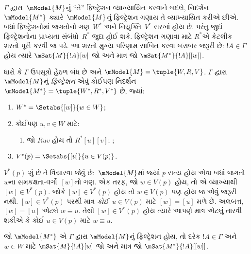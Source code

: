 \documentclass[../../../include/open-logic-section]{subfiles}
\begin{document}


$\Gamma$ દ્વારા~$\mModel{M}$નું ``તે'' ફિલ્ટ્રેશન વ્યાખ્યાયિત
કરવાને બદલે, નિદર્શન~$\mModel{M^*}$ ક્યારે~$\mModel{M}$નું
ફિલ્ટ્રેશન ગણાય તે વ્યાખ્યાયિત કરીએ છીએ. બધાં ફિલ્ટ્રેશનોમાં
જગતોનો ગણ~$W^*$ અને નિયુક્તિ~$V^*$ સરખાં હોય છે. પરંતુ જુદાં
ફિલ્ટ્રેશનોના પ્રાપ્યતા સંબંધો~$R^*$ જુદા હોઈ શકે. ફિલ્ટ્રેશન
ગણાવા માટે $R^*$એ કેટલીક શરતો પૂરી કરવી જ પડે. આ શરતો મુખ્ય
પરિણામ સાબિત કરવા બરાબર જરૂરી છે: $!A \in \Gamma$ હોય ત્યારે
$\mSat{M}{!A}[w]$ જો અને માત્ર જો
$\mSat{M^*}{!A}[{[w]}]$.

\begin{defn}
  ધારો કે $\Gamma$ ઉપસૂત્રો હેઠળ બંધ છે અને
  $\mModel{M} = \tuple{W, R, V}$. $\Gamma$ દ્વારા
  $\mModel{M}$નું \emph{ફિલ્ટ્રેશન} એવું કોઈપણ નિદર્શન
  $\mModel{M^*} = \tuple{W^*,R^*,V^*}$ છે, જ્યાં:
  \begin{enumerate}
  \item $W^* = \Setabs{[w]}{w \in W}$;
  \item {}%
    કોઈપણ $u,v \in W$ માટે:
    \begin{enumerate}
    \item {}%
      જો $Ruv$ હોય તો $R^*[u][v]$;
    ;
    \end{enumerate}
  \item $V^*(p) = \Setabs{[u]}{u \in V(p)}$.
  \end{enumerate}
\end{defn}

$V^*(p)$ શું છે તે વિચારવા જેવું છે:~$\mModel{M}$માં જ્યાં $p$
સત્ય હોય એવા બધાં જગતો~$w$ના સમકક્ષતા-વર્ગો~$[w]$નો ગણ.
એક તરફ, જો $w \in V(p)$ હોય, તો એ વ્યાખ્યાથી $[w] \in
V^*(p)$. જોકે $[w] \in V^*(p)$ હોય તો $w \in V(p)$ પણ હોય જ એવું
જરૂરી નથી. $[w] \in V^*(p)$ પરથી માત્ર \emph{કોઈ}~$u \in V(p)$
માટે $[w] = [u]$ મળે છે. અલબત્ત, $[w] = [u]$ એટલે
$w \equiv u$. તેથી $[w] \in V^*(p)$ હોય ત્યારે આપણે
માત્ર એટલું તારવી શકીએ કે કોઈ $u \in V(p)$ માટે $w \equiv u$.

\begin{thm}
  જો $\mModel{M^*}$ એ $\Gamma$ દ્વારા $\mModel{M}$નું ફિલ્ટ્રેશન
  હોય, તો દરેક $!A \in \Gamma$ અને $w \in W$ માટે
  $\mSat{M}{!A}[w]$ જો અને માત્ર જો
  $\mSat{M^*}{!A}[{[w]}]$.
\end{thm}
\end{document}
